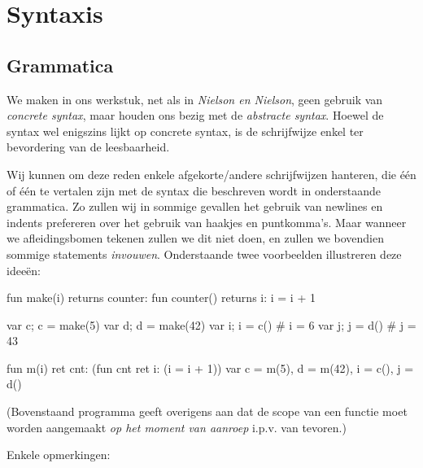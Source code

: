 \chapter{Syntaxis}

\section{Grammatica}

We maken in ons werkstuk, net als in \emph{Nielson en Nielson}, geen gebruik van \emph{concrete syntax}, maar houden ons bezig met de \emph{abstracte syntax}. Hoewel de syntax wel enigszins lijkt op concrete syntax, is de schrijfwijze enkel ter bevordering van de leesbaarheid.

Wij kunnen om deze reden enkele afgekorte/andere schrijfwijzen hanteren, die één of één te vertalen zijn met de syntax die beschreven wordt in onderstaande grammatica. Zo zullen wij in sommige gevallen het gebruik van newlines en indents prefereren over het gebruik van haakjes en puntkomma's. Maar wanneer we afleidingsbomen tekenen zullen we dit niet doen, en zullen we bovendien sommige statements \emph{invouwen}. Onderstaande twee voorbeelden illustreren deze ideeën:

\begin{program}
fun make(i) returns counter:
  fun counter() returns i:
    i = i + 1

var c; c = make(5)
var d; d = make(42)
var i; i = c() # i = 6
var j; j = d() # j = 43
\end{program}

\begin{program}
fun m(i) ret cnt: (fun cnt ret i: (i = i + 1))
var c = m(5), d = m(42), i = c(), j = d()
\end{program}

(Bovenstaand programma geeft overigens aan dat de scope van een functie moet worden aangemaakt \emph{op het moment van aanroep} i.p.v. van tevoren.)

Enkele opmerkingen:

